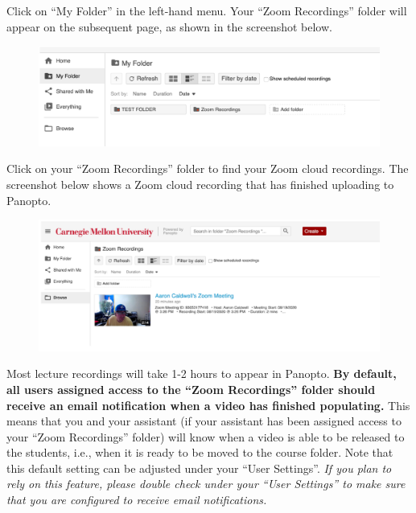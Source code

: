 \begin{gram}
	Click on ``My Folder'' in the left-hand menu. Your ``Zoom Recordings'' folder will appear on the subsequent page, as shown in the screenshot below.

	\begin{figure}[H]
		\centering
		\includegraphics[scale=0.6]{panopto/05-my-folder.png}
	\end{figure}
\end{gram}

\begin{gram}
	Click on your ``Zoom Recordings'' folder to find your Zoom cloud recordings. The screenshot below shows a Zoom cloud recording that has finished uploading to Panopto.

	\begin{figure}[H]
		\centering
		\includegraphics[scale=0.7]{panopto/06-zoom-recordings.png}
	\end{figure}
\end{gram}

\begin{gram}
	Most lecture recordings will take 1-2 hours to appear in Panopto. \textbf{By default, all users assigned access to the ``Zoom Recordings'' folder should receive an email notification when a video has finished populating.} This means that you and your assistant (if your assistant has been assigned access to your ``Zoom Recordings'' folder) will know when a video is able to be released to the students, i.e., when it is ready to be moved to the course folder. Note that this default setting can be adjusted under your ``User Settings''. \textit{If you plan to rely on this feature, please double check under your ``User Settings'' to make sure that you are configured to receive email notifications.}
\end{gram}


